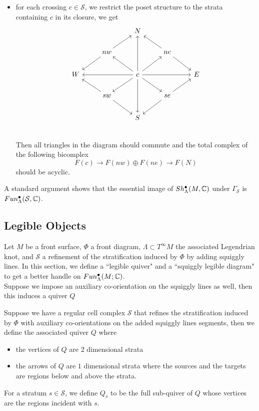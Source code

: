 \begin{definition}
\begin{itemize}
\item for each crossing $c\in \mathcal{S}$, we restrict the poset structure to the strata containing $c$ in its closure, we get
\[
\begin{tikzcd}
& & N & &\\
& nw\arrow[ur]\arrow[dl] & & ne\arrow[ul]\arrow[dr] &  \\
W& & c\arrow[uu]\arrow[dd]\arrow[ll]\arrow[rr]\arrow[ul]\arrow[ur]\arrow[dl]\arrow[dr] & & E \\
& sw\arrow[ul]\arrow[dr] & & se\arrow[ur]\arrow[dl] &  \\
& & S & &\\
\end{tikzcd}
\]
Then all triangles in the diagram should commute and the total complex of the following bicomplex 
\[
F(c)\rightarrow F(nw)\oplus F(ne) \rightarrow F(N)
\]
should be acyclic.
\end{itemize}
\end{definition}
A standard argument shows that the essential image of  $Sh^\bullet_\Lambda(M,\mathbb{C})$ under $\Gamma_\mathcal{S}$ is $Fun^\bullet_\Lambda(\mathcal{S},\mathbb{C})$\cite{shende2017legendrian}.

\subsection*{Legible Objects}
Let $M$ be a front surface, $\Phi$ a front diagram, $\Lambda \subset T^{\infty}M$ the associated Legendrian knot, and $\mathcal{S}$ a refinement of the stratification induced by $\Phi$ by adding squiggly lines. In this section, we define a ``legible quiver" and a ``squiggly legible diagram" to get a better handle on $Fun^\bullet_\Lambda(M;\mathbb{C})$.\\
Suppose we impose an auxiliary co-orientation on the squiggly lines as well, then this induces a quiver $Q$ 
\begin{definition}
Suppose we have a regular cell complex $\mathcal{S}$ that refines the stratification induced by $\Phi$ with auxiliary co-orientations on the added squiggly lines segments, then we define the associated quiver $Q$ where
\begin{itemize}
\item the vertices of $Q$ are $2$ dimensional strata
\item the arrows of $Q$ are $1$ dimensional strata where the sources and the targets are regions below and above the strata.
\end{itemize}
For a stratum $s\in \mathcal{S}$, we define $Q_s$ to be the full sub-quiver of $Q$ whose vertices are the regions incident with $s$.
\end{definition}

